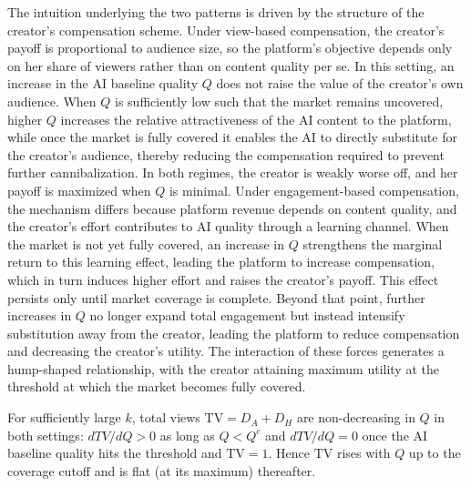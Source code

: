 The intuition underlying the two patterns is driven by the structure of the creator’s compensation scheme. Under view-based compensation, the creator’s payoff is proportional to audience size, so the platform’s objective depends only on her share of viewers rather than on content quality per se. In this setting, an increase in the AI baseline quality $Q$ does not raise the value of the creator’s own audience. When $Q$ is sufficiently low such that the market remains uncovered, higher $Q$ increases the relative attractiveness of the AI content to the platform, while once the market is fully covered it enables the AI to directly substitute for the creator’s audience, thereby reducing the compensation required to prevent further cannibalization. In both regimes, the creator is weakly worse off, and her payoff is maximized when $Q$ is minimal. Under engagement-based compensation, the mechanism differs because platform revenue depends on content quality, and the creator’s effort contributes to AI quality through a learning channel. When the market is not yet fully covered, an increase in $Q$ strengthens the marginal return to this learning effect, leading the platform to increase compensation, which in turn induces higher effort and raises the creator’s payoff. This effect persists only until market coverage is complete. Beyond that point, further increases in $Q$ no longer expand total engagement but instead intensify substitution away from the creator, leading the platform to reduce compensation and decreasing the creator’s utility. The interaction of these forces generates a hump-shaped relationship, with the creator attaining maximum utility at the threshold at which the market becomes fully covered.


\begin{corollary}\label{cor:Q_TV}
For sufficiently large $k$, total views $\mathrm{TV}=D_A+D_H$ are non-decreasing in $Q$
in both settings: $dTV/dQ>0$ as long as $Q<{Q}^c$ and $dTV/dQ=0$ once the AI baseline quality hits the threshold and $\mathrm{TV}=1$. Hence $\mathrm{TV}$ rises with
$Q$ up to the coverage cutoff and is flat (at its maximum) thereafter.
\end{corollary}

